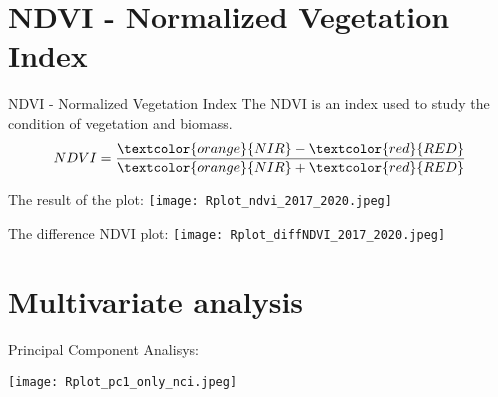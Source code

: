 \documentclass{beamer}
\begin{document}
\section{NDVI - Normalized Vegetation Index}
\begin{frame}{NDVI - Normalized Vegetation Index}
The NDVI is an index used to study the condition of vegetation and biomass. 
\bigskip
\begin{equation}
    NDVI = \frac{\textcolor{orange}{NIR} - \textcolor{red}{RED}}{\textcolor{orange}{NIR} + \textcolor{red}{RED}}
\end{equation}
  \texttt{\scriptsize{}}
    
\end{frame}

\begin{frame}%
    The result of the plot: 
    \texttt{[image: Rplot\_ndvi\_2017\_2020.jpeg]}\\
\end{frame}

\begin{frame}
The difference NDVI plot:
\texttt{\scriptsize{}}
    \centering
    \texttt{[image: Rplot\_diffNDVI\_2017\_2020.jpeg]}\\
\end{frame}

\section{{Multivariate analysis}}
\begin{frame}{Principal Component Analisys: }
\texttt{\tiny{}}
\end{frame}

\begin{frame}%
\texttt{\tiny{}}
\end{frame}

\begin{frame}%
\texttt{\tiny{}}
\centering
    \texttt{[image: Rplot\_pc1\_only\_nci.jpeg]}\\
\end{frame}
\end{document}
